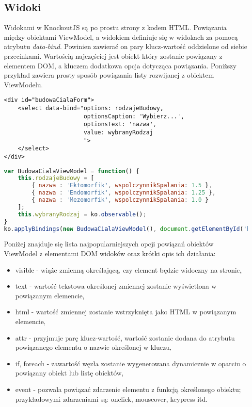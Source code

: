 \subsection{Widoki}
Widokami w KnockoutJS są po prostu strony z kodem HTML. Powiązania między obiektami ViewModel, a widokiem definiuje się w widokach za pomocą atrybutu \textit{data-bind}. Powinien zawierać on pary klucz-wartość oddzielone od siebie przecinkami. Wartością najczęściej jest obiekt który zostanie powiązany z elementem DOM, a kluczem dodatkowa opcja dotycząca powiązania. Poniższy przykład zawiera prosty sposób powiązania listy rozwijanej z obiektem ViewModelu.

\begin{lstlisting}[language=HTML5]
<div id="budowaCialaForm">
	<select data-bind="options: rodzajeBudowy,
					   optionsCaption: 'Wybierz...',
					   optionsText: 'nazwa',
					   value: wybranyRodzaj
					   ">
	</select>
</div>
\end{lstlisting}

\begin{lstlisting}[language=JavaScript]
var BudowaCialaViewModel = function() {
	this.rodzajeBudowy = [
		{ nazwa : 'Ektomorfik', wspolczynnikSpalania: 1.5 },
		{ nazwa : 'Endomorfik', wspolczynnikSpalania: 1.25 },
		{ nazwa : 'Mezomorfik', wspolczynnikSpalania: 1.0 }
	];
    this.wybranyRodzaj = ko.observable();
}
ko.applyBindings(new BudowaCialaViewModel(), document.getElementById('budowaCialaForm'));
\end{lstlisting}


Poniżej znajduje się lista najpopularniejszych opcji powiązań obiektów ViewModel z elementami DOM widoków oraz krótki opis ich działania:

\begin{itemize}
\item visible - wiąże zmienną określającą, czy element będzie widoczny na stronie,
\item text - wartość tekstowa określonej zmiennej zostanie wyświetlona w powiązanym elemencie,
\item html - wartość zmiennej zostanie wstrzyknięta jako HTML w powiązanym elemencie,
\item attr - przyjmuje parę klucz-wartość, wartość zostanie dodana do atrybutu powiązanego elementu o nazwie określonej w kluczu,
\item if, foreach - zawartość węzła zostanie wygenerowana dynamicznie w oparciu o powiązany obiekt lub listę obiektów,
\item event - pozwala powiązać zdarzenie elementu z funkcją określonego obiektu; przykładowymi zdarzeniami są: onclick, mouseover, keypress itd.
\end{itemize}

